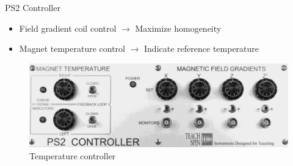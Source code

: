 \documentclass[aspectratio=169,xcolor=dvipsnames]{beamer}
\begin{document}
\begin{frame}{PS2 Controller}
    \begin{itemize}
        \item Field gradient coil control $\rightarrow$ Maximize homogeneity
        \item Magnet temperature control $\rightarrow$ Indicate reference temperature 
    \end{itemize}
    \begin{figure}
        \includegraphics[width = 0.6\linewidth]{figs/temp-controller.png}
        \caption{Temperature controller}
    \end{figure}
\end{frame}
\end{document}
